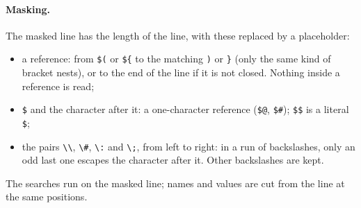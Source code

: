 \documentclass[11pt]{article}
\newcommand{\code}[1]{\mbox{\texttt{#1}}}
\begin{document}
\paragraph{Masking.} The masked line has the length of the line, with these replaced by a
placeholder:
\begin{itemize}
  \item a reference: from \code{\$(} or \code{\$\{} to the matching \code{)} or \code{\}}
        (only the same kind of bracket nests), or to the end of the line if it is not
        closed. Nothing inside a reference is read;
  \item \code{\$} and the character after it: a one-character reference (\code{\$@},
        \code{\$\#}); \code{\$\$} is a literal \code{\$};
  \item the pairs \code{\textbackslash\textbackslash}, \code{\textbackslash\#},
        \code{\textbackslash:} and \code{\textbackslash;}, from left to right: in a run of
        backslashes, only an odd last one escapes the character after it. Other
        backslashes are kept.
\end{itemize}
The searches run on the masked line; names and values are cut from the line at the same
positions.
\end{document}
